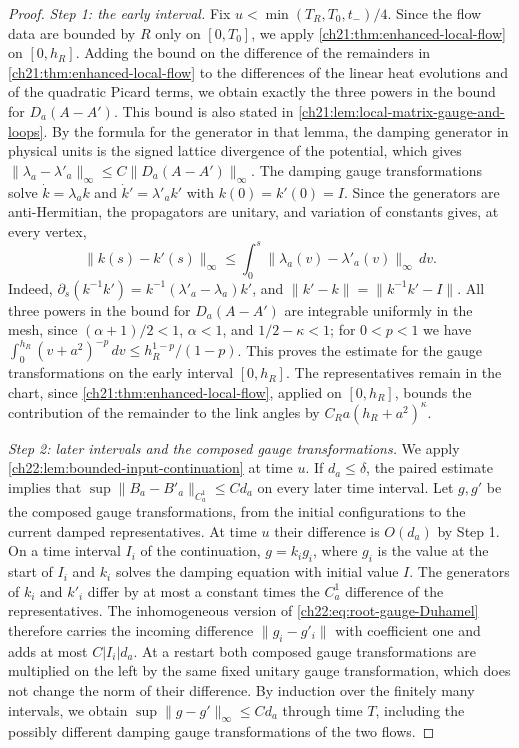 \begin{proof}
\emph{Step 1: the early interval.} Fix $u<\min(T_R,T_0,t_-)/4$. Since the flow data are bounded by $R$ only on $[0,T_0]$, we apply \cref{ch21:thm:enhanced-local-flow} on $[0,h_R]$. Adding the bound on the difference of the remainders in \cref{ch21:thm:enhanced-local-flow} to the differences of the linear heat evolutions and of the quadratic Picard terms, we obtain exactly the three powers in the bound for $D_a(A-A')$. This bound is also stated in \cref{ch21:lem:local-matrix-gauge-and-loops}. By the formula for the generator in that lemma, the damping generator in physical units is the signed lattice divergence of the potential, which gives $\|\lambda_a-\lambda'_a\|_\infty\le C\|D_a(A-A')\|_\infty$. The damping gauge transformations solve $\dot k=\lambda_ak$ and $\dot k'=\lambda'_ak'$ with $k(0)=k'(0)=I$. Since the generators are anti-Hermitian, the propagators are unitary, and variation of constants gives, at every vertex,
\begin{equation}\label{ch22:eq:root-gauge-Duhamel}
 \|k(s)-k'(s)\|_\infty\le\int_0^s\|\lambda_a(v)-\lambda'_a(v)\|_\infty\,dv .
\end{equation}
Indeed, $\partial_s(k^{-1}k')=k^{-1}(\lambda'_a-\lambda_a)k'$, and $\|k'-k\|=\|k^{-1}k'-I\|$. All three powers in the bound for $D_a(A-A')$ are integrable uniformly in the mesh, since $(\alpha+1)/2<1$, $\alpha<1$, and $1/2-\kappa<1$; for $0<p<1$ we have $\int_0^{h_R}(v+a^2)^{-p}\,dv\le h_R^{1-p}/(1-p)$. This proves the estimate for the gauge transformations on the early interval $[0,h_R]$. The representatives remain in the chart, since \cref{ch21:thm:enhanced-local-flow}, applied on $[0,h_R]$, bounds the contribution of the remainder to the link angles by $C_Ra(h_R+a^2)^\kappa$.

\emph{Step 2: later intervals and the composed gauge transformations.} We apply \cref{ch22:lem:bounded-input-continuation} at time $u$. If $d_a\le\delta$, the paired estimate implies that $\sup\|B_a-B'_a\|_{C_a^1}\le Cd_a$ on every later time interval. Let $g,g'$ be the composed gauge transformations, from the initial configurations to the current damped representatives. At time $u$ their difference is $O(d_a)$ by Step 1. On a time interval $I_i$ of the continuation, $g=k_ig_i$, where $g_i$ is the value at the start of $I_i$ and $k_i$ solves the damping equation with initial value $I$. The generators of $k_i$ and $k'_i$ differ by at most a constant times the $C_a^1$ difference of the representatives. The inhomogeneous version of \eqref{ch22:eq:root-gauge-Duhamel} therefore carries the incoming difference $\|g_i-g'_i\|$ with coefficient one and adds at most $C|I_i|d_a$. At a restart both composed gauge transformations are multiplied on the left by the same fixed unitary gauge transformation, which does not change the norm of their difference. By induction over the finitely many intervals, we obtain $\sup\|g-g'\|_\infty\le Cd_a$ through time $T$, including the possibly different damping gauge transformations of the two flows.


\end{proof}
